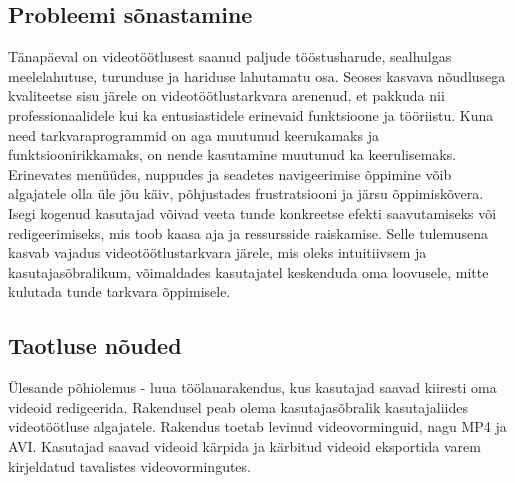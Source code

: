 \subsection{Probleemi sõnastamine}
\RaggedRight
\justifying
Tänapäeval on videotöötlusest saanud paljude tööstusharude, sealhulgas meelelahutuse, turunduse ja hariduse lahutamatu osa. Seoses kasvava nõudlusega kvaliteetse sisu järele on videotöötlustarkvara arenenud, et pakkuda nii professionaalidele kui ka entusiastidele erinevaid funktsioone ja tööriistu. Kuna need tarkvaraprogrammid on aga muutunud keerukamaks ja funktsioonirikkamaks, on nende kasutamine muutunud ka keerulisemaks. Erinevates menüüdes, nuppudes ja seadetes navigeerimise õppimine võib algajatele olla üle jõu käiv, põhjustades frustratsiooni ja järsu õppimiskõvera. Isegi kogenud kasutajad võivad veeta tunde konkreetse efekti saavutamiseks või redigeerimiseks, mis toob kaasa aja ja ressursside raiskamise. Selle tulemusena kasvab vajadus videotöötlustarkvara järele, mis oleks intuitiivsem ja kasutajasõbralikum, võimaldades kasutajatel keskenduda oma loovusele, mitte kulutada tunde tarkvara õppimisele.
\subsection{Taotluse nõuded}
Ülesande põhiolemus - luua töölauarakendus, kus kasutajad saavad kiiresti oma videoid redigeerida. Rakendusel peab olema kasutajasõbralik kasutajaliides videotöötluse algajatele. Rakendus toetab levinud videovorminguid, nagu MP4 ja AVI. Kasutajad saavad videoid kärpida ja kärbitud videoid eksportida varem kirjeldatud tavalistes videovormingutes.